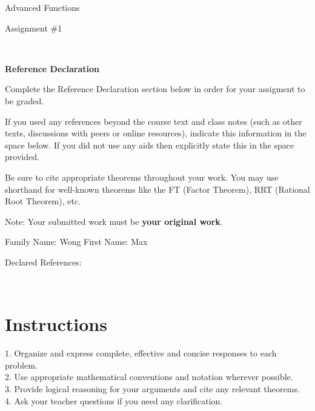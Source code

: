 \documentclass[12pt]{book}
\begin{document}
\vspace{-1.0in}\begin{center}
\Large{Advanced Functions }

\Large{Assignment \#1}


\end{center}


\vspace{0.015in}\hrulefill\ 

\textbf{Reference Declaration} %

Complete the Reference Declaration section below in order for your assigment to be graded.

If you used any references beyond the course text and class notes (such as other texts, discussions with peers or online resources), indicate this information in the space below.  If you did not use any aids then explicitly state this in the space provided. 

Be sure to cite appropriate theorems throughout your work. You may use shorthand for well-known theorems like the FT (Factor Theorem), RRT (Rational Root Theorem), etc. 

Note: Your submitted work must be \textbf{your original work}. 

Family Name: Wong%
First Name: Max%

Declared References: 


\vspace{0.015in}\hrulefill\ 

\newpage


\section*{Instructions}
\begin{center}
\setlength{\fboxrule}{2pt}
\begin{boxedminipage}{6.5in}
1.	Organize and express complete, effective and concise responses to each problem.\\
2.	Use appropriate mathematical conventions and notation wherever possible.\\
3.	Provide logical reasoning for your arguments and cite any relevant theorems. \\
4.  Ask your teacher questions if you need any clarification.
\end{boxedminipage}
\end{center} 
\end{document}
